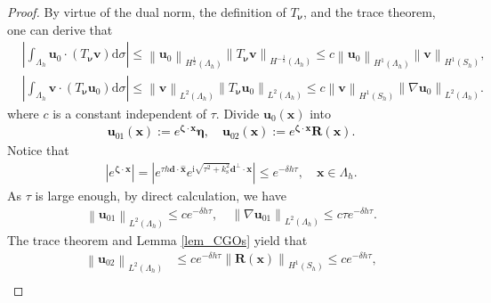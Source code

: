 \documentclass[11pt,reqno,oneside]{amsart}
\theoremstyle{definition}
\theoremstyle{remark}
\numberwithin{equation}{section}
\numberwithin{equation}{section}
\theoremstyle{remark}
\begin{document}
\begin{proof}
	By virtue of the dual norm, the definition of $ T_{\bm{\nu}} $, and the trace theorem, one can derive that
	\begin{align*} 
		& \left| \int_{\Lambda_h} \mathbf{u}_0 \cdot \left( T_{\bm{\nu}} \mathbf{v} \right) \mathrm{d}\sigma \right| \leqslant \left\| \mathbf{u}_0 \right\|_{H^{\frac{1}{2}} \left(\Lambda_h\right)} \left\| T_{\bm{\nu}} \mathbf{v} \right\|_{H^{-\frac{1}{2}} \left(\Lambda_h\right)} \leqslant c \left\| \mathbf{u}_0 \right\|_{H^1 \left(\Lambda_h\right)} \left\| \mathbf{v} \right\|_{H^1 \left(S_h\right)}, \\
		& \left| \int_{\Lambda_h} \mathbf{v} \cdot \left( T_{\bm{\nu}} \mathbf{u}_0 \right) \mathrm{d}\sigma \right| \leqslant \left\| \mathbf{v} \right\|_{L^2 \left(\Lambda_h\right)} \left\| T_{\bm{\nu}} \mathbf{u}_0 \right\|_{L^2 \left(\Lambda_h\right)} \leqslant c \left\| \mathbf{v} \right\|_{H^{1} \left(S_h\right)} \left\| \nabla\mathbf{u}_0 \right\|_{L^2 \left(\Lambda_h\right)}.
	\end{align*}
	where $ c $ is a constant independent of $ \tau $. Divide $ \mathbf{u}_0\left(\mathbf{x}\right) $ into 
	\textcolor{black}{\begin{align} \label{def_IP_u01u02}
			\mathbf{u}_{01}\left(\mathbf{x}\right) := e^{\bm{\zeta} \cdot \mathbf{x}} \bm{\eta}, \quad \mathbf{u}_{02}\left(\mathbf{x}\right) := e^{\bm{\zeta} \cdot \mathbf{x}} \mathbf{R}\left(\mathbf{x}\right).
	\end{align}}
	Notice that 
	\begin{align*} 
		\left| e^{\bm{\zeta} \cdot \mathbf{x}} \right| = \left| e^{ \tau h \mathbf{d}\cdot\hat{\mathbf{x}} } e^{\mathrm{i}\sqrt{ \tau^2 + k_{\mathrm{s}}^2 } \mathbf{d}^{\perp}\cdot\mathbf{x}} \right| \leqslant e^{-\delta h \tau} , \quad \mathbf{x}\in\Lambda_h.
	\end{align*}
	As $ \tau $ is large enough, by direct calculation, we have
	\begin{align*} 
		\left\| \mathbf{u}_{01} \right\|_{L^2 \left(\Lambda_h\right)}  
		\leqslant c e^{-\delta h \tau}, \quad \left\| \nabla\mathbf{u}_{01} \right\|_{L^2 \left(\Lambda_h\right)} \leqslant c \tau e^{-\delta h \tau}.
	\end{align*}
	The trace theorem and Lemma \ref{lem_CGOs} yield that
	\begin{align*} 
		\left\| \mathbf{u}_{02} \right\|_{L^2 \left(\Lambda_h\right)} & \leqslant c e^{-\delta h \tau} \left\| \mathbf{R}\left(\mathbf{x}\right) \right\|_{H^1 \left(S_h\right)} \leqslant c e^{-\delta h \tau},\\ 

\end{align*}
\end{proof}
\end{document}
